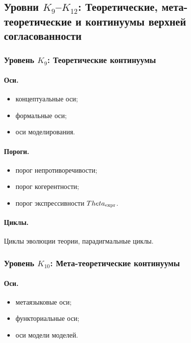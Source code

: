 \subsection{Уровни \texorpdfstring{\texorpdfstring{$K_9$}{K\_9}–$K_{12}$}{K9–K12}: Теоретические, мета-теоретические и континуумы верхней согласованности}

\subsubsection{Уровень \texorpdfstring{\(K_9\)}{K9}: Теоретические континуумы}

\paragraph{Оси.}
\begin{itemize}
    \item концептуальные оси;
    \item формальные оси;
    \item оси моделирования.
\end{itemize}

\paragraph{Пороги.}
\begin{itemize}
    \item порог непротиворечивости;
    \item порог когерентности;
    \item порог экспрессивности \(\Theta_{\rm expr}\).
\end{itemize}

\paragraph{Циклы.}
Циклы эволюции теории, парадигмальные циклы.

\subsubsection{Уровень \(K_{10}\): Мета-теоретические континуумы}

\paragraph{Оси.}
\begin{itemize}
    \item метаязыковые оси;
    \item функториальные оси;
    \item оси модели моделей.
\end{itemize}

